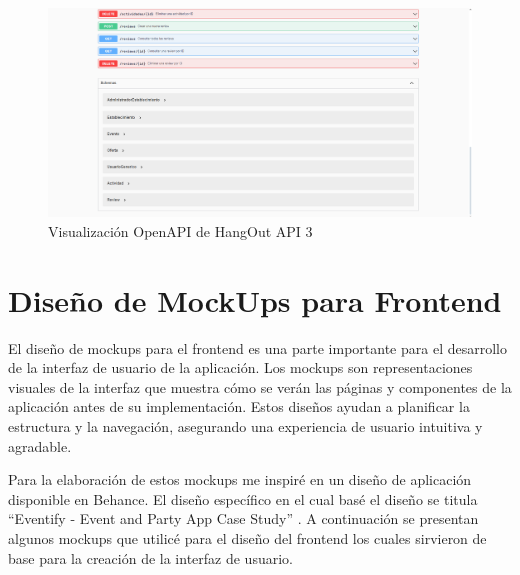 \clearpage
\begin{landscape}
\thispagestyle{empty}
\begin{figure}[H]
    \centering
    \includegraphics[width=\linewidth]{imagenes/OpenApi3.png}
    \caption{Visualización OpenAPI de HangOut API 3}
    \label{fig:OpenApi3}
\end{figure}
\end{landscape}

\section{Diseño de MockUps para Frontend}

El diseño de mockups para el frontend es una parte importante para el desarrollo de la interfaz de usuario de la aplicación. Los mockups son representaciones visuales de la interfaz que muestra cómo se verán las páginas y componentes de la aplicación antes de su implementación. Estos diseños ayudan a planificar la estructura y la navegación, asegurando una experiencia de usuario intuitiva y agradable. 

Para la elaboración de estos mockups me inspiré en un diseño de aplicación disponible en Behance. El diseño específico en el cual basé el diseño se titula “Eventify - Event and Party App Case Study” \cite{polina_rusenova}. A continuación se presentan algunos mockups que utilicé para el diseño del frontend los cuales sirvieron de base para la creación de la interfaz de usuario.


